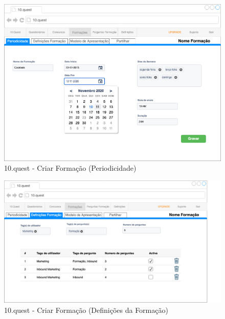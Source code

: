 \begin{figure}[ht!]
	\begin{center}
		\includegraphics[width=1\textwidth]{img/prototipos/9.png}
		\caption{10.quest - Criar Formação (Periodicidade)}
		\label{10q-}
	\end{center}
\end{figure}

\begin{figure}[ht!]
	\begin{center}
		\includegraphics[width=1\textwidth]{img/prototipos/10.png}
		\caption{10.quest - Criar Formação (Definições da Formação)}
		\label{10q-}
	\end{center}
\end{figure}

